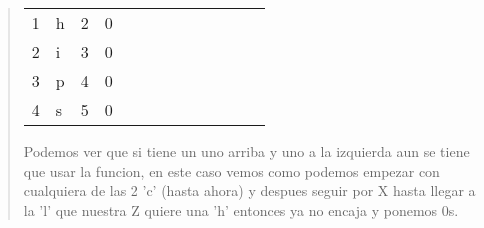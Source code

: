 \begin{quote}
\begin{table}[H]
\begin{tabular}{lllllllllllll}
          1 & h & \multicolumn{1}{l|}{2} & \multicolumn{1}{l|}{0} & \multicolumn{1}{l|}{}  & \multicolumn{1}{l|}{}  & \multicolumn{1}{l|}{}  & \multicolumn{1}{l|}{}  & \multicolumn{1}{l|}{}  & \multicolumn{1}{l|}{}  & \multicolumn{1}{l|}{}  & \multicolumn{1}{l|}{}  & \multicolumn{1}{l|}{}  \\ \cline{4-13} 
          2 & i & \multicolumn{1}{l|}{3} & \multicolumn{1}{l|}{0} & \multicolumn{1}{l|}{}  & \multicolumn{1}{l|}{}  & \multicolumn{1}{l|}{}  & \multicolumn{1}{l|}{}  & \multicolumn{1}{l|}{}  & \multicolumn{1}{l|}{}  & \multicolumn{1}{l|}{}  & \multicolumn{1}{l|}{}  & \multicolumn{1}{l|}{}  \\ \cline{4-13} 
          3 & p & \multicolumn{1}{l|}{4} & \multicolumn{1}{l|}{0} & \multicolumn{1}{l|}{}  & \multicolumn{1}{l|}{}  & \multicolumn{1}{l|}{}  & \multicolumn{1}{l|}{}  & \multicolumn{1}{l|}{}  & \multicolumn{1}{l|}{}  & \multicolumn{1}{l|}{}  & \multicolumn{1}{l|}{}  & \multicolumn{1}{l|}{}  \\ \cline{4-13} 
          4 & s & \multicolumn{1}{l|}{5} & \multicolumn{1}{l|}{0} & \multicolumn{1}{l|}{}  & \multicolumn{1}{l|}{}  & \multicolumn{1}{l|}{}  & \multicolumn{1}{l|}{}  & \multicolumn{1}{l|}{}  & \multicolumn{1}{l|}{}  & \multicolumn{1}{l|}{}  & \multicolumn{1}{l|}{}  & \multicolumn{1}{l|}{}  \\ \cline{4-13} 
          \end{tabular}
    \end{table}

    Podemos ver que si tiene un uno arriba y uno a la izquierda aun se tiene que usar la funcion, en este caso vemos como podemos empezar con cualquiera de las 2 'c' (hasta ahora) y despues seguir por X hasta llegar a la 'l' que nuestra Z quiere una 'h' entonces ya no encaja y ponemos 0s. \vspace{.2cm}


\end{quote}

